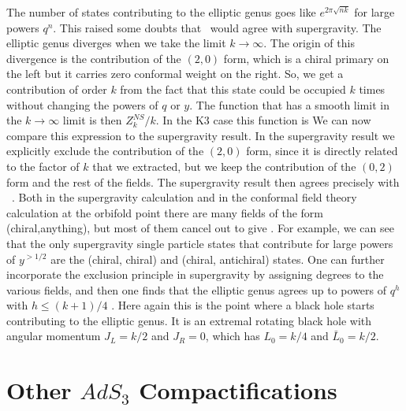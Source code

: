 The number of states contributing to the elliptic genus
goes like $e^{ 2 \pi \sqrt{n k} }$  for  large powers $q^n$.
This raised some doubts that \elliptic\ would agree with supergravity.
The elliptic genus diverges when we take the limit $k\to \infty $.
The origin of this divergence is the contribution of the $(2,0)$ form,
which is a chiral primary on the left but it carries zero 
conformal weight on the right. So, we get a contribution of order $k$ 
from the fact that this state could be occupied $k$ times without 
changing the powers of $q$ or $y$. The function that has a smooth
limit in the $k\to \infty $ limit is then $Z_k^{NS}/k $. 
In the K3 case this function is 
We can now compare this expression to the supergravity result. In the
supergravity result we explicitly exclude the contribution of the
$(2,0)$ form, since it is directly related to the factor of $k$ that
we extracted, but we keep the contribution of the $(0,2)$ form and the 
rest of the fields. The supergravity result then agrees precisely with 
\ellsu\ \cite{deBoer:1998us}.
 Both in the supergravity calculation and in the conformal field
theory calculation at the orbifold point there are many fields of the 
form (chiral,anything), but most of them cancel out to give \ellsu.
For example, we can see that the only supergravity single particle
states  that 
contribute for large powers of  $y^{>1/2}$
 are the (chiral, chiral) and (chiral, antichiral) states.
One can further incorporate the exclusion principle in supergravity
by assigning degrees to the various fields, and then one finds
that the elliptic genus agrees up to powers of $q^h$ with $h \leq (k+1)/4$
 \cite{deBoer:1998us}. 
Here again this is the point where a black hole starts contributing
to the elliptic genus. It is an extremal
 rotating black hole with angular 
momentum $J_L = k/2$ and $J_R=0$, which has $L_0 = k/4$ and 
$\bar L_0 = k/2$. 




\section{Other $AdS_3$ Compactifications}

